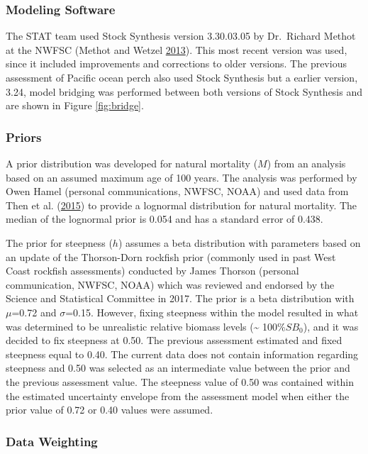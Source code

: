 \documentclass[12pt,]{article}
\begin{document}
\subsubsection{Modeling Software}\label{modeling-software}

The STAT team used Stock Synthesis version 3.30.03.05 by Dr.~Richard
Methot at the NWFSC (Methot and Wetzel
\protect\hyperlink{ref-methot_stock_2013}{2013}). This most recent
version was used, since it included improvements and corrections to
older versions. The previous assessment of Pacific ocean perch also used
Stock Synthesis but a earlier version, 3.24, model bridging was
performed between both versions of Stock Synthesis and are shown in
Figure \ref{fig:bridge}.

\subsubsection{Priors}\label{priors}

A prior distribution was developed for natural mortality (\(M\)) from an
analysis based on an assumed maximum age of 100 years. The analysis was
performed by Owen Hamel (personal communications, NWFSC, NOAA) and used
data from Then et al.
(\protect\hyperlink{ref-then_evaluating_2015}{2015}) to provide a
lognormal distribution for natural mortality. The median of the
lognormal prior is 0.054 and has a standard error of 0.438.

The prior for steepness (\(h\)) assumes a beta distribution with
parameters based on an update of the Thorson-Dorn rockfish prior
(commonly used in past West Coast rockfish assessments) conducted by
James Thorson (personal communication, NWFSC, NOAA) which was reviewed
and endorsed by the Science and Statistical Committee in 2017. The prior
is a beta distribution with \(\mu\)=0.72 and \(\sigma\)=0.15. However,
fixing steepness within the model resulted in what was determined to be
unrealistic relative biomass levels (\textasciitilde{} 100\%\(SB_0\)),
and it was decided to fix steepness at 0.50. The previous assessment
estimated and fixed steepness equal to 0.40. The current data does not
contain information regarding steepness and 0.50 was selected as an
intermediate value between the prior and the previous assessment value.
The steepness value of 0.50 was contained within the estimated
uncertainty envelope from the assessment model when either the prior
value of 0.72 or 0.40 values were assumed.

\subsubsection{Data Weighting}\label{data-weighting}
\end{document}
